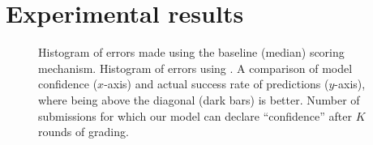 \section{Experimental results}\label{sec:experiments}
\begin{figure}
\begin{center}
\end{center}
\caption{
 Histogram of errors made using the baseline (median) scoring mechanism. 
  Histogram of errors using \PGthree.  
   A comparison of model confidence ($x$-axis) and actual success rate of predictions ($y$-axis), where
 being above the diagonal (dark bars) is better.
  Number of submissions for which our model can declare ``confidence''
 after $K$ rounds of grading.
 }
\label{tab:predacc}

\end{figure}

